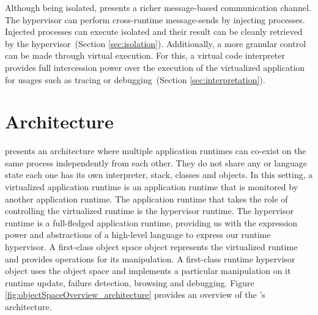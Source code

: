 Although being isolated, \Vtt presents a richer message-based communication channel. The hypervisor can perform cross-runtime message-sends by injecting processes. Injected processes can execute isolated and their result can be cleanly retrieved by the hypervisor~(Section \ref{sec:isolation}).
Additionally, a more granular control can be made through virtual execution. For this, a virtual code interpreter provides full intercession power over the execution of the virtualized application for usages such as tracing or debugging~(Section \ref{sec:interpretation}).





\section{\Vtt Architecture} \label{sec:virtualization_overview}

\Vtt presents an architecture where multiple application runtimes can co-exist on the same process independently from each other. They do not share any \VM or language state \ie each one has its own interpreter, stack, classes and objects. In this setting, a virtualized application runtime is an application runtime that is monitored by another application runtime. The application runtime that takes the role of controlling the virtualized runtime is the hypervisor runtime. The hypervisor runtime is a full-fledged application runtime, providing us with the expression power and abstractions of a high-level language to express our runtime hypervisor. A first-class object space object represents the virtualized runtime and provides operations for its manipulation. A first-class runtime hypervisor object uses the object space and implements a particular manipulation on it \eg runtime update, failure detection, browsing and debugging. Figure \ref{fig:objectSpaceOverview_architecture} provides an overview of the \Vtt's architecture.

